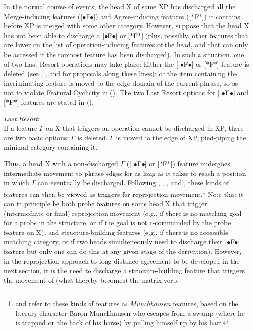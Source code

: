\documentclass[output=paper
,modfonts
,nonflat]{langsci/langscibook}
\begin{document}
In the normal course of events, the head X of some XP has discharged
all the Merge-inducing features ([{\small $\bullet$}F{\small $\bullet$}])
 and Agree-inducing features ([$*$F$*$]) it contains before XP is merged with some
 other category. However, suppose that the head X has not been able to
 discharge a [{\small $\bullet$}F{\small $\bullet$}] or [$*$F$*$]
 (plus, possibly, other features that are lower on the list of
 operation-inducing features of the head, and that can only be accessed
 if the topmost feature has been discharged). In such a situation, one
 of two Last Resort operations may take place: Either the [{\small
     $\bullet$}F{\small $\bullet$}] or [$*$F$*$] feature is deleted (see 
\cite{Bejar&Rezac:09},
  \cite{Preminger:14}, and  \cite{Georgi:14} for proposals along these
  lines); or the item containing the incriminating feature is moved to the edge domain of
  the current phrase, so as not to violate Featural Cyclicity
  in (\Last). The two Last Resort options for [{\small
      $\bullet$}F{\small $\bullet$}] and [$*$F$*$] features are stated
  in (\Next). 

\ea\label{ex:mueller:28} {\itshape Last Resort}:\\
If a feature $\Gamma$ on X that triggers an operation cannot be discharged
in XP, there are two basic options:
\ea $\Gamma$ is deleted.
\ex $\Gamma$ is moved to the edge of XP, pied-piping the minimal
category containing it. 
\z
\z

Thus, a head X with a non-discharged $\Gamma$ ([{\small
    $\bullet$}F{\small $\bullet$}] or [$*$F$*$]) feature undergoes
intermediate movement to phrase edges for as long as it takes to reach
a position in which $\Gamma$ can eventually be discharged.  Following
\cite{Fanselow:03,Fanselow:09:boo}, \cite{Suranyi:05},
\cite{Matushansky:06}, and \cite{Georgi&Mueller:10:rep}, these kinds
of features can then be viewed as triggers for reprojection
movement.\footnote{\cite{Fanselow:03,Fanselow:09:boo} and
  \cite{Georgi&Mueller:10:rep} refer to these kinds of features as
       {\itshape M\"unchhausen} features, based on the literary character
       Baron M\"unchhausen who escapes from a swamp (where he is
       trapped on the back of his horse) by pulling himself up by his
       hair.} Note that it can in principle be both probe features on
some head X that trigger (intermediate or final) reprojection movement
(e.g., if there is no matching goal for a probe in the structure, or
if the goal is not c-commanded by the probe feature on X), and
structure-building features (e.g., if there is no accessible matching
category, or if two heads simulteneously need to discharge their
[{\small $\bullet$}F{\small $\bullet$}] feature but only one can do
this at any given stage of the derivation). However, in the
reprojection approach to long-distance agreement to be developed in
the next section, it is the need to discharge a structure-building
feature that triggers the movement of (what thereby becomes) the
matrix verb.
\end{document}
